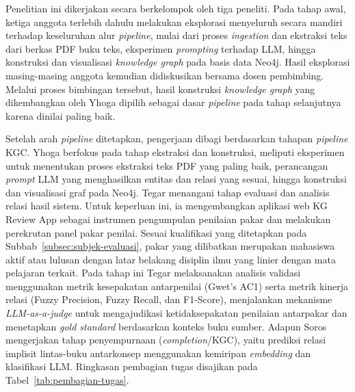 \documentclass[../../thesis]{subfiles}
\begin{document}
\ifSubfilesClassLoaded{}{\appendix\setcounter{chapter}{1}}

\label{lamp:pembagian-tugas}

Penelitian ini dikerjakan secara berkelompok oleh tiga peneliti. Pada
tahap awal, ketiga anggota terlebih dahulu melakukan eksplorasi
menyeluruh secara mandiri terhadap keseluruhan alur \textit{pipeline},
mulai dari proses \textit{ingestion} dan ekstraksi teks dari berkas PDF
buku teks, eksperimen \textit{prompting} terhadap LLM, hingga konstruksi
dan visualisasi \textit{knowledge graph} pada basis data Neo4j. Hasil
eksplorasi masing-masing anggota kemudian didiskusikan bersama dosen
pembimbing. Melalui proses bimbingan tersebut, hasil konstruksi
\textit{knowledge graph} yang dikembangkan oleh Yhoga dipilih sebagai
dasar \textit{pipeline} pada tahap selanjutnya karena dinilai paling baik.

Setelah arah \textit{pipeline} ditetapkan, pengerjaan dibagi berdasarkan
tahapan \textit{pipeline} KGC. Yhoga berfokus pada tahap ekstraksi dan
konstruksi, meliputi eksperimen untuk menentukan proses ekstraksi teks
PDF yang paling baik, perancangan \textit{prompt} LLM yang menghasilkan
entitas dan relasi yang sesuai, hingga konstruksi dan visualisasi graf
pada Neo4j. Tegar menangani tahap evaluasi dan analisis relasi hasil
sistem. Untuk keperluan ini, ia mengembangkan aplikasi web KG Review App
sebagai instrumen pengumpulan penilaian pakar dan melakukan perekrutan
panel pakar penilai. Sesuai kualifikasi yang ditetapkan pada
Subbab~\ref{subsec:subjek-evaluasi}, pakar yang dilibatkan merupakan
mahasiswa aktif atau lulusan dengan latar belakang disiplin ilmu yang
linier dengan mata pelajaran terkait. Pada tahap ini Tegar melaksanakan
analisis validasi menggunakan metrik kesepakatan antarpenilai (Gwet's
AC1) serta metrik kinerja relasi (Fuzzy Precision, Fuzzy Recall, dan
F1-Score), menjalankan mekanisme \textit{LLM-as-a-judge} untuk
mengajudikasi ketidaksepakatan penilaian antarpakar dan menetapkan
\textit{gold standard} berdasarkan konteks buku sumber. Adapun Soros
mengerjakan tahap penyempurnaan (\textit{completion}/KGC), yaitu prediksi
relasi implisit lintas-buku antarkonsep menggunakan kemiripan
\textit{embedding} dan klasifikasi LLM. Ringkasan pembagian tugas
disajikan pada Tabel~\ref{tab:pembagian-tugas}.
\end{document}
